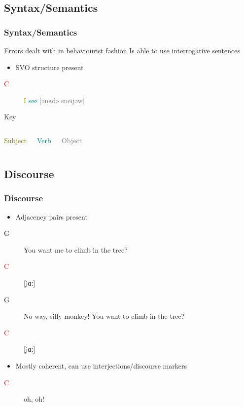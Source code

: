 \documentclass[compress]{beamer}
\begin{document}
\subsection{Syntax/Semantics}
\begin{frame}
	\frametitle{Syntax/Semantics}
	
	Errors dealt with in behaviourist fashion
	Is able to use interrogative sentences
	
	\begin{itemize}
		\item SVO structure present
	\end{itemize}
	\begin{description}
		\item[\textcolor{red}{C}] \textcolor{olive}{I} \textcolor{teal}{see} \textcolor{gray}{[ənʌdə sneɪjəw]}
	\end{description}
	
	\begin{block}{Key}
	\begin{columns}
		\centering
		\textcolor{olive}{Subject}

		\centering
		\textcolor{teal}{Verb}
		
		\centering
		\textcolor{gray}{Object}
	\end{columns} 
	\end{block}
	
\end{frame}

\subsection{Discourse}
\begin{frame}
	\frametitle{Discourse}
	
	\begin{itemize}
		\item Adjacency pairs present
	\end{itemize}
	\begin{description}
		\item[G] You want me to climb in the tree?
		\item[\textcolor{red}{C}] [jɑː]
		\item[G] No way, silly monkey! You want to climb in the tree?
		\item[\textcolor{red}{C}] [jɑː]
	\end{description}
	
	 \begin{itemize}
		\item Mostly coherent, can use interjections/discourse markers
	\end{itemize}
	\begin{description}
		\item[\textcolor{red}{C}] oh, oh!
	\end{description}
	
\end{frame}
\end{document}
